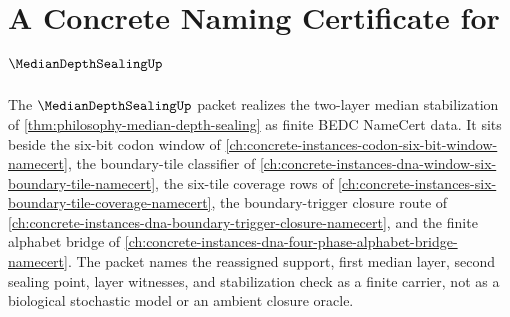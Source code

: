\chapter{A Concrete Naming Certificate for $\MedianDepthSealingUp$}
\label{ch:concrete-instances-median-depth-sealing-namecert}

The $\MedianDepthSealingUp$ packet realizes the two-layer median stabilization of \autoref{thm:philosophy-median-depth-sealing} as finite BEDC NameCert data. It sits beside the six-bit codon window of \autoref{ch:concrete-instances-codon-six-bit-window-namecert}, the boundary-tile classifier of \autoref{ch:concrete-instances-dna-window-six-boundary-tile-namecert}, the six-tile coverage rows of \autoref{ch:concrete-instances-six-boundary-tile-coverage-namecert}, the boundary-trigger closure route of \autoref{ch:concrete-instances-dna-boundary-trigger-closure-namecert}, and the finite alphabet bridge of \autoref{ch:concrete-instances-dna-four-phase-alphabet-bridge-namecert}. The packet names the reassigned support, first median layer, second sealing point, layer witnesses, and stabilization check as a finite carrier, not as a biological stochastic model or an ambient closure oracle.

